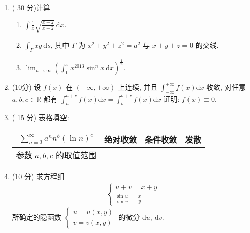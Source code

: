 \documentclass[space]{ctexart} %
\begin{document}
\vspace*{0.5cm}
\begin{enumerate}[itemsep=1.2em,label=\arabic*.,topsep=0pt,left=0em]
\item ( 30 分)计算

\setcounter{enumii}{0}
\begin{enumerate}[itemsep=1.2em,label=(\arabic*),topsep=0pt,left=2em] %

  \item $\int \frac{1}{x} \sqrt{\frac{x+2}{x-2}} \mathrm{~d} x $.

  \item  $\int_{\Gamma} x y \mathrm{~d} s $, 其中  $\Gamma $ 为 $ x^{2}+y^{2}+z^{2}=a^{2} $ 与 $ x+y+z=0 $ 的交线.

  \item  $\lim _{n \rightarrow \infty}\left(\int_{0}^{\pi} x^{2013} \sin ^{n} x \mathrm{~d} x\right)^{\frac{1}{n}}$.

\end{enumerate}

\item   (10分) 设 $ f(x) $ 在 $ (-\infty,+\infty) $ 上连续, 并且  $\int_{-\infty}^{+\infty} f(x) \mathrm{d} x $ 收敛, 对任意 $ a, b, c \in \mathbb{R}$  都有 $ \int_{a}^{a+c} f(x) \mathrm{d} x=
 \int_{b}^{b+c} f(x) \mathrm{d} x $ 证明: $ f(x) \equiv 0 $.

\item   ( 15 分) 表格填空:\\
\begin{center}
\begin{tabular}{|c|l|l|l|}
\hline $\sum_{n=3}^{\infty} a^{n} n^{b}(\ln n)^{c} $ & 绝对收敛 & 条件收敛 & 发散 \\
\hline 参数 $ a, b, c$  的取值范围 & & & \\
\hline
\end{tabular}
\end{center}

\item   (10 分)  求方程组
\begin{align*}
\begin{cases}
    u+v=x+y \\
\frac{\sin u}{\sin v}=\frac{x}{y}
\end{cases}
\end{align*}
所确定的隐函数 $ \begin{cases}
    u=u(x, y) \\
     v=v(x, y)
\end{cases}$
 的微分  $\mathrm{d} u, \mathrm{~d} v $.


\end{enumerate}
\end{document}
